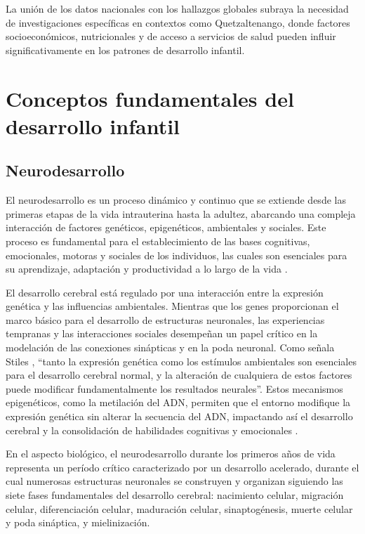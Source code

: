 \documentclass[11pt,letterpaper]{report}
\begin{document}
La unión de los datos nacionales con los hallazgos globales subraya la 
necesidad de investigaciones específicas en contextos como Quetzaltenango, 
donde factores socioeconómicos, nutricionales y de acceso a servicios de salud 
pueden influir significativamente en los patrones de desarrollo infantil.

\section{Conceptos fundamentales del desarrollo infantil}
\subsection{Neurodesarrollo}
El neurodesarrollo es un proceso dinámico y continuo que se extiende desde 
las primeras etapas de la vida intrauterina hasta la adultez, abarcando una 
compleja interacción de factores genéticos, epigenéticos, ambientales y 
sociales. Este proceso es fundamental para el establecimiento de las bases 
cognitivas, emocionales, motoras y sociales de los individuos, las cuales 
son esenciales para su aprendizaje, adaptación y productividad a lo largo 
de la vida \cite{Stiles2010, Nelson49}.

El desarrollo cerebral está regulado por una interacción entre la expresión 
genética y las influencias ambientales. Mientras que los genes proporcionan 
el marco básico para el desarrollo de estructuras neuronales, las 
experiencias tempranas y las interacciones sociales desempeñan un papel 
crítico en la modelación de las conexiones sinápticas y en la poda neuronal. 
Como señala Stiles \cite{Stiles2010}, ``tanto la expresión genética como los
estímulos ambientales son esenciales para el desarrollo cerebral normal, y la
alteración de cualquiera de estos factores puede modificar fundamentalmente los
resultados neurales''. Estos mecanismos epigenéticos, como la metilación del
ADN, permiten que el entorno modifique la expresión genética sin alterar la
secuencia del ADN,  impactando así el desarrollo cerebral y la consolidación de
habilidades cognitivas y emocionales \cite{Roth2011, Feldman2}.

En el aspecto biológico, el neurodesarrollo durante los primeros años de vida
representa un período crítico caracterizado por un desarrollo acelerado, 
durante el cual numerosas estructuras neuronales se construyen y organizan 
siguiendo las siete fases fundamentales del desarrollo cerebral: nacimiento 
celular, migración celular, diferenciación celular, maduración celular, 
sinaptogénesis, muerte celular y poda sináptica, y mielinización.
\cite{Kolb7}
\end{document}
